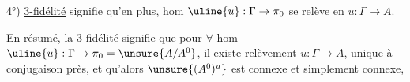 
4°) \uline{3-fidélité} signifie qu'en plus,  hom \(\uline{u}:\Gamma\to\pi_0\) se relève en \(u:\Gamma\to A\).

En résumé,  la 3-fidélité signifie que pour \(\forall\) hom \(\uline{u}:\Gamma\to\pi_0=\unsure{A/A^0}\), il existe  relèvement \(u:\Gamma\to A\), unique à conjugaison près, et qu'alors \(\unsure{(A^0)^u}\) est connexe et simplement connexe,

